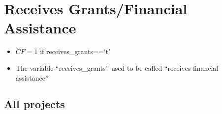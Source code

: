 \documentclass[
]{article}
\providecommand{\tightlist}{%
  \setlength{\itemsep}{0pt}\setlength{\parskip}{0pt}}
\begin{document}
\hypertarget{receives-grantsfinancial-assistance}{%
\section{Receives Grants/Financial
Assistance}\label{receives-grantsfinancial-assistance}}

\begin{itemize}
\tightlist
\item
  \(CF=1\) if receives\_grants==`t'
\item
  The variable ``receives\_grants'' used to be called ``receives
  financial assistance''
\end{itemize}

\hypertarget{all-projects}{%
\subsection{All projects}\label{all-projects}}
\end{document}
